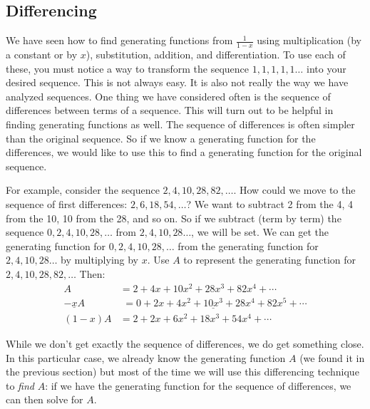 \documentclass[10pt,]{book}
\theoremstyle{plain}
\theoremstyle{definition}
\theoremstyle{definition}
\theoremstyle{definition}
\theoremstyle{definition}
\numberwithin{equation}{chapter}
\newcommand{\amp}{&}
\begin{document}
\subsection[{Differencing}]{Differencing}\label{subsection-22}
\hypertarget{p-976}{}%
We have seen how to find generating functions from \(\frac{1}{1-x}\) using multiplication (by a constant or by \(x\)), substitution, addition, and differentiation. To use each of these, you must notice a way to transform the sequence \(1,1,1,1,1\ldots\) into your desired sequence. This is not always easy. It is also not really the way we have analyzed sequences. One thing we have considered often is the sequence of differences between terms of a sequence. This will turn out to be helpful in finding generating functions as well. The sequence of differences is often simpler than the original sequence. So if we know a generating function for the differences, we would like to use this to find a generating function for the original sequence.%
\par
\hypertarget{p-977}{}%
For example, consider the sequence \(2, 4, 10, 28, 82, \ldots\). How could we move to the sequence of first differences: \(2, 6, 18, 54,\ldots\)? We want to subtract 2 from the 4, 4 from the 10, 10 from the 28, and so on. So if we subtract (term by term) the sequence \(0, 2, 4, 10, 28,\ldots\) from \(2, 4, 10, 28\ldots\), we will be set. We can get the generating function for \(0,2,4,10,28,\ldots\) from the generating function for \(2,4,10,28\ldots\) by multiplying by \(x\). Use \(A\) to represent the generating function for \(2, 4, 10, 28, 82, \ldots\) Then:%
\begin{align*}
A \amp  = 2 + 4x + 10x^2 +28x^3 + 82x^4 + \cdots\\
\underline{-xA} \amp  \underline{\,\,= 0 + 2x + 4x^2 + 10x^3 + 28 x^4 + 82x^5 + \cdots}\\
(1-x)A \amp  = 2 + 2x + 6x^2 + 18x^3 + 54x^4 + \cdots
\end{align*}
%
\par
\hypertarget{p-978}{}%
While we don't get exactly the sequence of differences, we do get something close. In this particular case, we already know the generating function \(A\) (we found it in the previous section) but most of the time we will use this differencing technique to \emph{find} \(A\): if we have the generating function for the sequence of differences, we can then solve for \(A\).%
\end{document}
